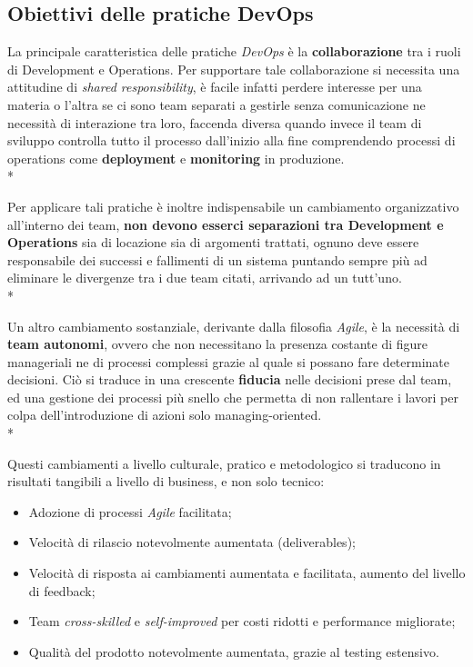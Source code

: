 \documentclass[a4paper,12pt]{report}
\begin{document}
			\subsection{Obiettivi delle pratiche DevOps}
			
				La principale caratteristica delle pratiche \emph{DevOps} è la \textbf{collaborazione} tra i ruoli di Development e Operations.
				Per supportare tale collaborazione si necessita una attitudine di \emph{shared responsibility}, è facile infatti perdere interesse per una materia o l'altra se ci sono team separati a gestirle senza comunicazione ne necessità di interazione tra loro, faccenda diversa quando invece il team di sviluppo controlla tutto il processo dall'inizio alla fine comprendendo processi di operations come \textbf{deployment} e \textbf{monitoring} in produzione.\\*
				
				Per applicare tali pratiche è inoltre indispensabile un cambiamento organizzativo all'interno dei team, \textbf{non devono esserci separazioni tra Development e Operations} sia di locazione sia di argomenti trattati, ognuno deve essere responsabile dei successi e fallimenti di un sistema puntando sempre più ad eliminare le divergenze tra i due team citati, arrivando ad un tutt'uno.\\*
				
				Un altro cambiamento sostanziale, derivante dalla filosofia \emph{Agile}, è la necessità di \textbf{team autonomi}, ovvero che non necessitano la presenza costante di figure manageriali ne di processi complessi grazie al quale si possano fare determinate decisioni. Ciò si traduce in una crescente \textbf{fiducia} nelle decisioni prese dal team, ed una gestione dei processi più snello che permetta di non rallentare i lavori per colpa dell'introduzione di azioni solo managing-oriented.\\*
			
				Questi cambiamenti a livello culturale, pratico e metodologico si traducono in risultati tangibili a livello di business, e non solo tecnico:
				\begin{itemize}
					\item Adozione di processi \emph{Agile} facilitata;
					\item Velocità di rilascio notevolmente aumentata (deliverables);
					\item Velocità di risposta ai cambiamenti aumentata e facilitata, aumento del livello di feedback;
					\item Team \emph{cross-skilled} e \emph{self-improved} per costi ridotti e performance migliorate;
					\item Qualità del prodotto notevolmente aumentata, grazie al testing estensivo.
				\end{itemize}
			
\end{document}
